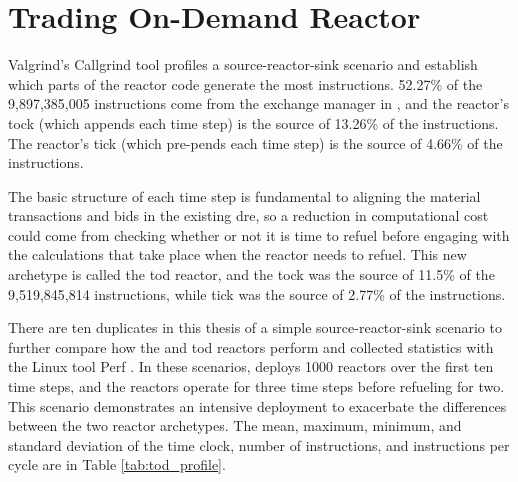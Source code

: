 \section{Trading On-Demand Reactor}
\label{sec:trading_reactor}



Valgrind's \cite{valgrind} Callgrind \cite{callgrind} tool profiles a source-reactor-sink scenario and establish which parts of the \cycamore reactor code generate the most instructions. 52.27\% of the 9,897,385,005 instructions come from the exchange manager in \cyclus, and the reactor's tock (which appends each time step) is the source of 13.26\% of the instructions. The reactor's tick (which pre-pends each time step) is the source of 4.66\% of the instructions.

The basic structure of each time step is fundamental to aligning the material transactions and bids in the existing \gls{dre}, so a reduction in computational cost could come from checking whether or not it is time to refuel before engaging with the calculations that take place when the reactor needs to refuel. This new archetype is called the \gls{tod} reactor, and the tock was the source of 11.5\% of the 9,519,845,814 instructions, while tick was the source of 2.77\% of the instructions.



There are ten duplicates in this thesis of a simple source-reactor-sink scenario to further compare how the \cycamore and \gls{tod} reactors perform and collected statistics with the Linux tool Perf \cite{perf}. In these scenarios, \cyclus deploys 1000 reactors over the first ten time steps, and the reactors operate for three time steps before refueling for two. This scenario demonstrates an intensive deployment to exacerbate the differences between the two reactor archetypes. The mean, maximum, minimum, and standard deviation of the time clock, number of instructions, and instructions per cycle are in Table \ref{tab:tod_profile}.

